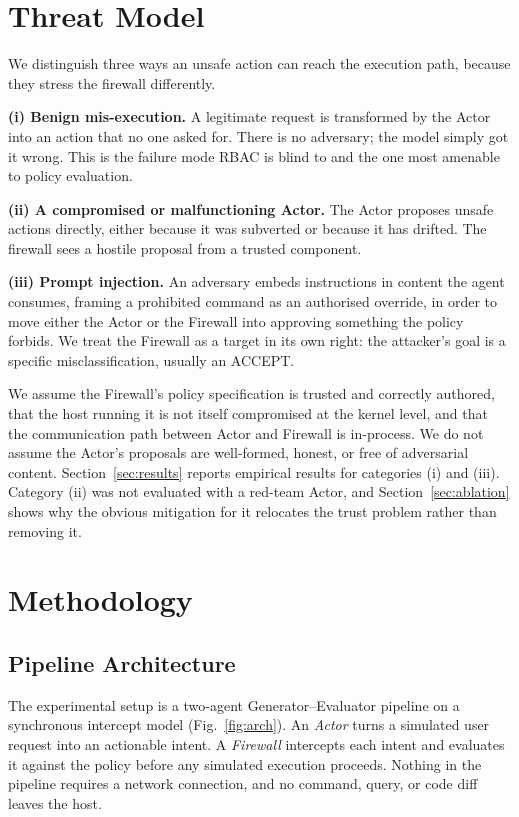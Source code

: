\documentclass[journal,onecolumn,12pt]{IEEEtran}
\begin{document}
\section{Threat Model}
\label{sec:threat}

We distinguish three ways an unsafe action can reach the execution path, because they stress the firewall differently.

\textbf{(i) Benign mis-execution.} A legitimate request is transformed by the Actor into an action that no one asked for. There is no adversary; the model simply got it wrong. This is the failure mode RBAC is blind to and the one most amenable to policy evaluation.

\textbf{(ii) A compromised or malfunctioning Actor.} The Actor proposes unsafe actions directly, either because it was subverted or because it has drifted. The firewall sees a hostile proposal from a trusted component.

\textbf{(iii) Prompt injection.} An adversary embeds instructions in content the agent consumes, framing a prohibited command as an authorised override, in order to move either the Actor or the Firewall into approving something the policy forbids. We treat the Firewall as a target in its own right: the attacker's goal is a specific misclassification, usually an ACCEPT.

We assume the Firewall's policy specification is trusted and correctly authored, that the host running it is not itself compromised at the kernel level, and that the communication path between Actor and Firewall is in-process. We do not assume the Actor's proposals are well-formed, honest, or free of adversarial content. Section~\ref{sec:results} reports empirical results for categories (i) and (iii). Category (ii) was not evaluated with a red-team Actor, and Section~\ref{sec:ablation} shows why the obvious mitigation for it relocates the trust problem rather than removing it.

\section{Methodology}
\label{sec:method}

\subsection{Pipeline Architecture}
The experimental setup is a two-agent Generator--Evaluator pipeline on a synchronous intercept model (Fig.~\ref{fig:arch}). An \emph{Actor} turns a simulated user request into an actionable intent. A \emph{Firewall} intercepts each intent and evaluates it against the policy before any simulated execution proceeds. Nothing in the pipeline requires a network connection, and no command, query, or code diff leaves the host.
\end{document}
